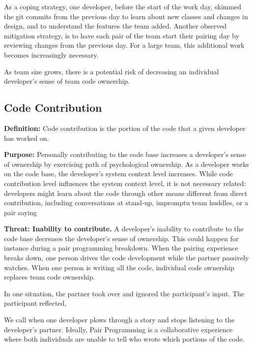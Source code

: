 As a coping strategy, one developer, before the start of the work day, skimmed the git commits from the previous day to learn about new classes and changes in design, and to understand the features the team added. Another observed mitigation strategy, is to have each pair of the team start their pairing day by reviewing changes from the previous day. For a large team, this additional work becomes increasingly necessary. 

As team size grows, there is a potential risk of decreasing an individual developer's sense of team code ownership. 

\subsection{Code Contribution}
\textbf{Definition:} Code contribution is the portion of the code that a given developer has worked on. 

\textbf{Purpose:} Personally contributing to the code base increases a developer's sense of ownership by exercising  path of psychological ownership. As a developer works on the code base, the developer's system context level increases. While code contribution level influences the system context level, it is not necessary related: developers might learn about the code through other means different from direct contribution, including conversations at stand-up, impromptu team huddles, or a pair saying 

\textbf{Threat: Inability to contribute.}  A developer's inability to contribute to the code base decreases the developer's sense of ownership. This could happen for instance during a pair programming breakdown. When the pairing experience breaks down, one person drives the code development while the partner passively watches. When one person is writing all the code, individual code ownership replaces team code ownership.  

In one situation, the partner took over and ignored the participant's input. The participant reflected,  

We call  when one developer plows through a story and stops listening to the developer's partner. Ideally, Pair Programming is a collaborative experience where both individuals are unable to tell who wrote which portions of the code. 

